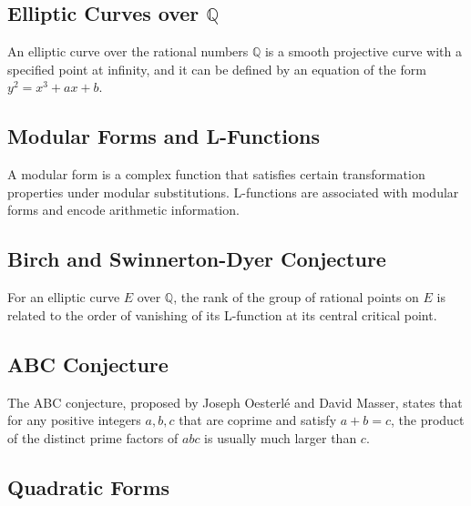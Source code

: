 \documentclass{article}
\begin{document}
\subsection{Elliptic Curves over $\mathbb{Q}$}

\begin{definition}
An elliptic curve over the rational numbers $\mathbb{Q}$ is a smooth projective curve with a specified point at infinity, and it can be defined by an equation of the form $y^2 = x^3 + ax + b$.
\end{definition}

\subsection{Modular Forms and L-Functions}

\begin{definition}
A modular form is a complex function that satisfies certain transformation properties under modular substitutions. L-functions are associated with modular forms and encode arithmetic information.
\end{definition}

\subsection{Birch and Swinnerton-Dyer Conjecture}

\begin{theorem}
For an elliptic curve $E$ over $\mathbb{Q}$, the rank of the group of rational points on $E$ is related to the order of vanishing of its L-function at its central critical point.
\end{theorem}

\subsection{ABC Conjecture}

\begin{theorem}
The ABC conjecture, proposed by Joseph Oesterlé and David Masser, states that for any positive integers $a, b, c$ that are coprime and satisfy $a + b = c$, the product of the distinct prime factors of $abc$ is usually much larger than $c$.
\end{theorem}

\subsection{Quadratic Forms}
\end{document}

